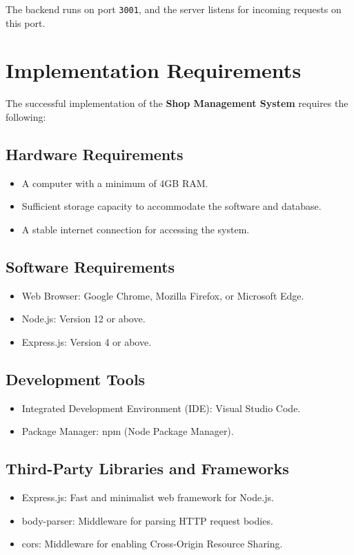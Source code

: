 The backend runs on port \texttt{3001}, and the server listens for incoming requests on this port.


\section{Implementation Requirements}
The successful implementation of the \textbf{Shop Management System} requires the following:

\subsection{Hardware Requirements}
\begin{itemize}
    \item A computer with a minimum of 4GB RAM.
    \item Sufficient storage capacity to accommodate the software and database.
    \item A stable internet connection for accessing the system.
\end{itemize}

\subsection{Software Requirements}
\begin{itemize}
    \item Web Browser: Google Chrome, Mozilla Firefox, or Microsoft Edge.
    \item Node.js: Version 12 or above.
    \item Express.js: Version 4 or above.
\end{itemize}

\subsection{Development Tools}
\begin{itemize}
    \item Integrated Development Environment (IDE): Visual Studio Code.
    \item Package Manager: npm (Node Package Manager).
\end{itemize}

\subsection{Third-Party Libraries and Frameworks}
\begin{itemize}
    \item Express.js: Fast and minimalist web framework for Node.js.
    \item body-parser: Middleware for parsing HTTP request bodies.
    \item cors: Middleware for enabling Cross-Origin Resource Sharing.
\end{itemize}


